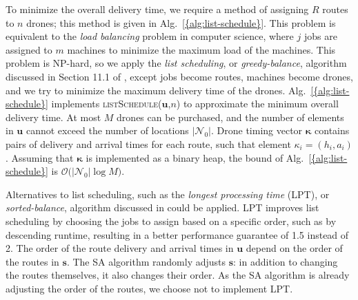 \documentclass[journal]{IEEEtran}
\begin{document}
To minimize the overall delivery time, we require a method of assigning ${\ensuremath{R}}$ routes to ${\ensuremath{n}}$ drones; this method is given in {Alg.~\ref{{alg:list-schedule}}}. This problem is equivalent to the \emph{load balancing} problem in computer science, where $j$ jobs are assigned to $m$ machines to minimize the maximum load of the machines. This problem is NP-hard, so we apply the \emph{list scheduling}, or \emph{greedy-balance}, algorithm discussed in Section 11.1 of \cite{Kleinberg2011}, except jobs become routes, machines become drones, and we try to minimize the maximum delivery time of the drones. {Alg.~\ref{{alg:list-schedule}}} implements \textsc{listSchedule}(${\ensuremath{\mathbf{u}}}$,${\ensuremath{n}}$) to approximate the minimum overall delivery time. At most ${\ensuremath{M}}$ drones can be purchased, and the number of elements in ${\ensuremath{\mathbf{u}}}$ cannot exceed the number of locations $|{\ensuremath{{\ensuremath{\mathcal{N}}}_{0}}}|$. Drone timing vector ${\ensuremath{\boldsymbol{\kappa}}}$ contains pairs of delivery and arrival times for each route, such that element ${\ensuremath{\kappa_{{i}}}} = ({\ensuremath{h_{{i}}}},{\ensuremath{a_{{i}}}})$. Assuming that ${\ensuremath{\boldsymbol{\kappa}}}$ is implemented as a binary heap, the bound of {Alg.~\ref{{alg:list-schedule}}} is ${\ensuremath{\mathcal{O}\bigl({|{\ensuremath{{\ensuremath{\mathcal{N}}}_{0}}}|\log{\ensuremath{M}}}\bigr)}}$.

Alternatives to list scheduling, such as the \emph{longest processing time} (LPT), or \emph{sorted-balance}, algorithm discussed in \cite{Kleinberg2011} could be applied. LPT improves list scheduling by choosing the jobs to assign based on a specific order, such as by descending runtime, resulting in a better performance guarantee of 1.5 instead of 2. The order of the route delivery and arrival times in ${\ensuremath{\mathbf{u}}}$ depend on the order of the routes in ${\ensuremath{\mathbf{s}}}$. The SA algorithm randomly adjusts ${\ensuremath{\mathbf{s}}}$: in addition to changing the routes themselves, it also changes their order. As the SA algorithm is already adjusting the order of the routes, we choose not to implement LPT.
\end{document}
